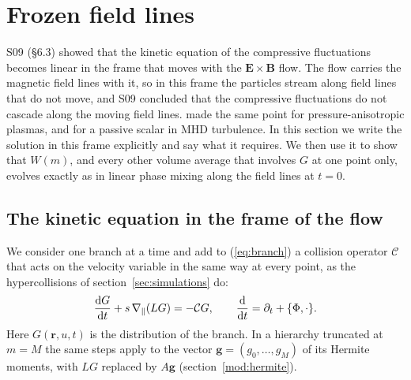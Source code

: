 \section{Frozen field lines}\label{sec:frozen}

S09 (\S6.3) showed that the kinetic equation of the compressive fluctuations becomes linear in the frame that moves with the $\boldsymbol E\times\boldsymbol B$ flow. The flow carries the magnetic field lines with it, so in this frame the particles stream along field lines that do not move, and S09 concluded that the compressive fluctuations do not cascade along the moving field lines. \citet[\S\S2.6 and~4.1]{Kunz2015} made the same point for pressure-anisotropic plasmas, and \citet[\S2.3.1]{LithwickGoldreich2001} for a passive scalar in MHD turbulence. In this section we write the solution in this frame explicitly and say what it requires. We then use it to show that $W(m)$, and every other volume average that involves $G$ at one point only, evolves exactly as in linear phase mixing along the field lines at $t=0$.

\subsection{The kinetic equation in the frame of the flow}\label{fr:solution}

We consider one branch at a time and add to (\ref{eq:branch}) a collision operator $\mathcal C$ that acts on the velocity variable in the same way at every point, as the hypercollisions of section~\ref{sec:simulations} do:
\begin{equation}\label{lag:kin}
  \frac{\mathrm{d} G}{\mathrm{d} t}+s\,\nabla_\parallel(LG)=-\mathcal CG,\qquad \frac{\mathrm{d}}{\mathrm{d} t}=\partial_t+\{\Phi,\cdot\} .
\end{equation}
Here $G(\boldsymbol r,u,t)$ is the distribution of the branch. In a hierarchy truncated at $m=M$ the same steps apply to the vector $\boldsymbol g=(g_0,\dots,g_M)$ of its Hermite moments, with $LG$ replaced by $A\boldsymbol g$ (section~\ref{mod:hermite}).

